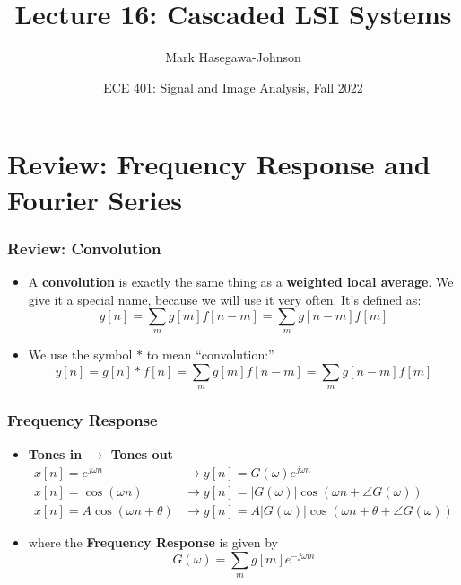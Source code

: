 \documentclass{beamer}
\title{Lecture 16: Cascaded LSI Systems}
\author{Mark Hasegawa-Johnson}
\date{ECE 401: Signal and Image Analysis, Fall 2022}
\begin{document}
\begin{frame}
  \maketitle
\end{frame}

\begin{frame}
  \tableofcontents
\end{frame}

\section[Review]{Review: Frequency Response and Fourier Series}
\setcounter{subsection}{1}

\begin{frame}
  \frametitle{Review: Convolution}
  \begin{itemize}
  \item A {\bf convolution} is exactly the same thing as a {\bf weighted local average}.
    We give it a special name, because we will use it very often.  It's defined as:
    \[
    y[n] = \sum_m g[m] f[n-m] = \sum_m g[n-m] f[m]
    \]
  \item 
    We use the symbol $\ast$ to mean ``convolution:''
    \[
    y[n]=g[n]\ast f[n] = \sum_m g[m] f[n-m] = \sum_m g[n-m] f[m]
    \]
  \end{itemize}
\end{frame}

\begin{frame}
  \frametitle{Frequency Response}
  \begin{itemize}
  \item {\bf Tones in $\rightarrow$ Tones out}
    \begin{align*}
      x[n]=e^{j\omega n} &\rightarrow y[n]=G(\omega)e^{j\omega n}\\
      x[n]=\cos\left(\omega n\right)
      &\rightarrow y[n]=|G(\omega)|\cos\left(\omega n+\angle G(\omega)\right)\\
      x[n]=A\cos\left(\omega n+\theta\right)
      &\rightarrow y[n]=A|G(\omega)|\cos\left(\omega n+\theta+\angle G(\omega)\right)
    \end{align*}
  \item where the {\bf Frequency Response} is given by
    \[
    G(\omega) = \sum_m g[m]e^{-j\omega m}
    \]
  \end{itemize}
\end{frame}
\end{document}
